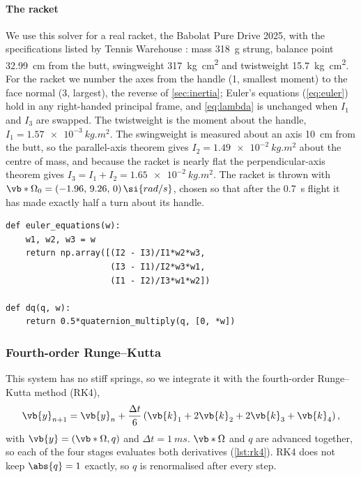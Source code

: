 \begin{sloppypar} %
\paragraph{The racket}
We use this solver for a real racket, the Babolat Pure Drive 2025, with the specifications listed by Tennis Warehouse \cite{tw_puredrive,twu_analyzer}: mass \SI{318}{g} strung, balance point \SI{32.99}{cm} from the butt, swingweight \SI{317}{kg.cm^2} and twistweight \SI{15.7}{kg.cm^2}.
For the racket we number the axes from the handle (1, smallest moment) to the face normal (3, largest), the reverse of \cref{sec:inertia}; Euler's equations (\cref{eq:euler}) hold in any right-handed principal frame, and \cref{eq:lambda} is unchanged when $I_1$ and $I_3$ are swapped.
The twistweight is the moment about the handle, $I_1=\SI{1.57e-3}{kg.m^2}$.
The swingweight is measured about an axis \SI{10}{cm} from the butt, so the parallel-axis theorem gives $I_2=\SI{1.49e-2}{kg.m^2}$ about the centre of mass, and because the racket is nearly flat the perpendicular-axis theorem gives $I_3=I_1+I_2=\SI{1.65e-2}{kg.m^2}$.
The racket is thrown with $\vb*{\Omega}_0=(-1.96,\,9.26,\,0)\,\si{rad/s}$, chosen so that after the \SI{0.7}{s} flight it has made exactly half a turn about its handle.
\end{sloppypar}

\medskip\noindent\begin{minipage}{\linewidth}
\begin{verbatim}
def euler_equations(w):
    w1, w2, w3 = w
    return np.array([(I2 - I3)/I1*w2*w3,
                     (I3 - I1)/I2*w3*w1,
                     (I1 - I2)/I3*w1*w2])

def dq(q, w):
    return 0.5*quaternion_multiply(q, [0, *w])
\end{verbatim}
\label{lst:derivs}
\end{minipage}\par\medskip

\subsubsection{Fourth-order Runge--Kutta}
\label{sec:rk4}
This system has no stiff springs, so we integrate it with the fourth-order Runge--Kutta method (RK4),
\begin{equation}
    \vb{y}_{n+1} = \vb{y}_n + \frac{\Delta t}{6}\left(\vb{k}_1+2\vb{k}_2+2\vb{k}_3+\vb{k}_4\right),
    \label{eq:rk4}
\end{equation}
with $\vb{y}=(\vb*{\Omega},q)$ and $\Delta t=\SI{1}{ms}$.
$\vb*{\Omega}$ and $q$ are advanced together, so each of the four stages evaluates both derivatives (\cref{lst:rk4}).
RK4 does not keep $\abs{q}=1$ exactly, so $q$ is renormalised after every step.


